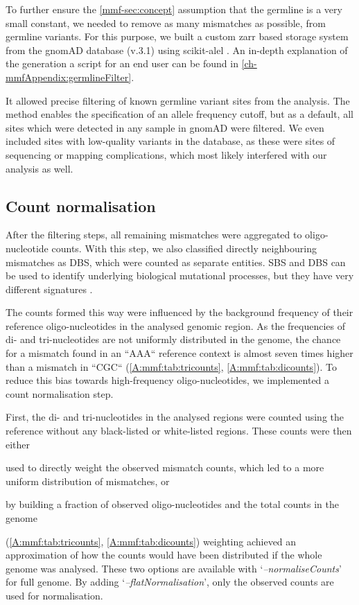 To further ensure the \autoref{mmf-sec:concept} assumption that the germline is a very small constant, we needed to remove as many mismatches as possible,  from germline variants. For this purpose, we built a custom zarr \cite{Miles2021} based storage system from the gnomAD database (v.3.1) \cite{Karczewski2020} using scikit-alel \cite{Miles2021a}.
An in-depth explanation of the generation  a script for an end user can be found in \autoref{ch-mmfAppendix:germlineFilter}.

It allowed precise filtering of known germline variant sites from the analysis. The method enables the specification of an allele frequency cutoff, but as a default, all sites which were detected in any sample in gnomAD were filtered. We even included sites with low-quality variants in the database, as these were sites of sequencing or mapping complications, which most likely interfered with our analysis as well.


\subsection[Count normalisation]{Count normalisation}
\label{mmf-sec:countNorm}
After the filtering steps, all remaining mismatches were aggregated to oligo-nucleotide counts. With this step, we also classified directly neighbouring mismatches as DBS, which were counted as separate entities. SBS and DBS  can be used to identify underlying biological mutational processes, but they have very different  signatures \cite{Alexandrov2020}.
 
The counts formed this way were influenced by the background frequency of their reference oligo-nucleotides in the analysed genomic region. As the frequencies of di- and tri-nucleotides are not uniformly distributed in the genome, the chance for a mismatch found in an ``AAA`` reference context is almost seven times higher than a mismatch in ``CGC`` (\autoref{A:mmf:tab:tricounts}, \autoref{A:mmf:tab:dicounts}). To reduce this bias towards high-frequency oligo-nucleotides, we implemented a count normalisation step.

First, the di- and tri-nucleotides in the analysed regions were counted using the reference without any black-listed or white-listed regions. These counts were then either \begin{enumerate*}[label={(\roman*)}]
 \item used to directly weight the observed mismatch counts, which led to a more uniform distribution of mismatches, or
 \item by building a fraction of observed oligo-nucleotides and the total counts in the genome
\end{enumerate*} (\autoref{A:mmf:tab:tricounts}, \autoref{A:mmf:tab:dicounts}) weighting achieved an approximation of how the counts would have been distributed if the whole genome was analysed. These two options are available with \lq\emph{--normaliseCounts}\rq~ for  full genome. By  adding \lq\emph{--flatNormalisation}\rq, only the observed counts are used for normalisation.

